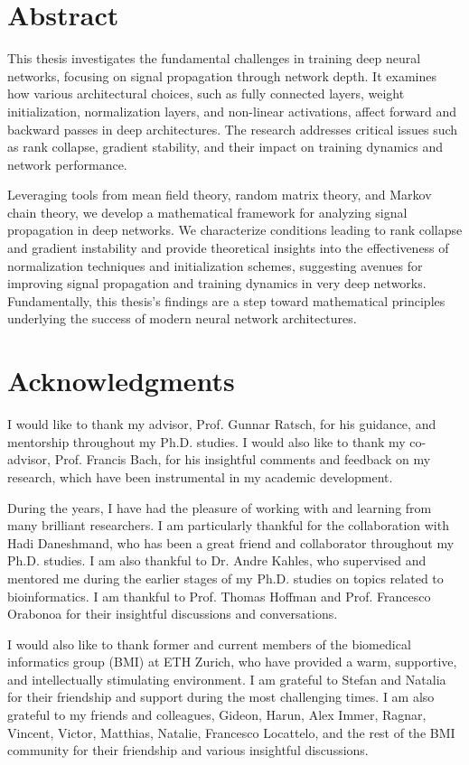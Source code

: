 

\chapter*{Abstract}
This thesis investigates the fundamental challenges in training deep neural networks, focusing on signal propagation through network depth. It examines how various architectural choices, such as fully connected layers, weight initialization, normalization layers, and non-linear activations, affect forward and backward passes in deep architectures. The research addresses critical issues such as rank collapse, gradient stability, and their impact on training dynamics and network performance.

Leveraging tools from mean field theory, random matrix theory, and Markov chain theory, we develop a mathematical framework for analyzing signal propagation in deep networks. We characterize conditions leading to rank collapse and gradient instability and provide theoretical insights into the effectiveness of normalization techniques and initialization schemes, suggesting avenues for improving signal propagation and training dynamics in very deep networks. Fundamentally, this thesis's findings are a step toward mathematical principles underlying the success of modern neural network architectures.

\chapter*{Acknowledgments}
I would like to thank my advisor, Prof. Gunnar Ratsch, for his guidance, and mentorship throughout my Ph.D. studies. I would also like to thank my co-advisor, Prof. Francis Bach, for his insightful comments and feedback on my research, which have been instrumental in my academic development. 


During the years, I have had the pleasure of working with and learning from many brilliant researchers. I am particularly thankful for the collaboration with Hadi Daneshmand, who has been a great friend and collaborator throughout my Ph.D. studies. I am also thankful to Dr. Andre Kahles, who supervised and mentored me during the earlier stages of my Ph.D. studies on topics related to bioinformatics. I am thankful to Prof. Thomas Hoffman and Prof. Francesco Orabonoa for their insightful discussions and conversations. 

I would also like to thank former and current members of the biomedical informatics group (BMI) at ETH Zurich, who have provided a warm, supportive, and intellectually stimulating environment. I am grateful to Stefan and Natalia for their friendship and support during the most challenging times. I am also grateful to my friends and colleagues, Gideon, Harun, Alex Immer, Ragnar, Vincent, Victor, Matthias, Natalie, Francesco Locattelo, and the rest of the BMI community for their friendship and various insightful discussions. 

